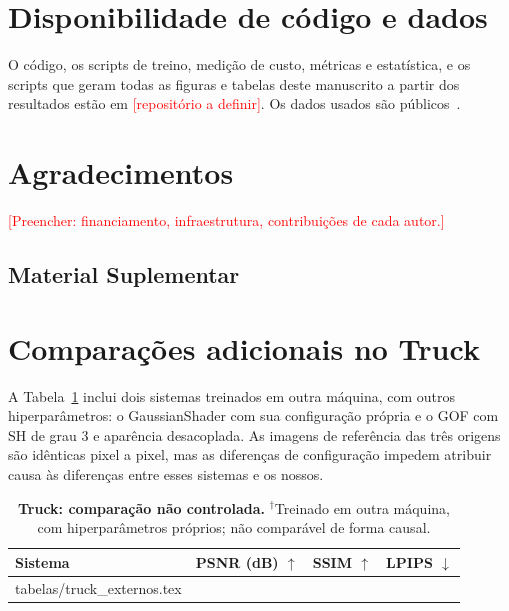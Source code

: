 \documentclass[12pt]{article}
\makeatletter
\newcommand{\revisar}[1]{\textcolor{red}{[#1]}}
\newcommand{\inputtab}[1]{\@@input #1 } %
\makeatother
\begin{document}
\section*{Disponibilidade de código e dados}
O código, os scripts de treino, medição de custo, métricas e estatística, e os scripts que geram todas as figuras e tabelas deste manuscrito a partir dos resultados estão em \revisar{repositório a definir}.
Os dados usados são públicos~\cite{knapitsch2017tanks,liu2023nero}.

\section*{Agradecimentos}
\revisar{Preencher: financiamento, infraestrutura, contribuições de cada autor.}




\newpage
\renewcommand{\thefigure}{S\arabic{figure}}
\renewcommand{\thetable}{S\arabic{table}}
\renewcommand{\theequation}{S\arabic{equation}}
\renewcommand{\thesection}{S\arabic{section}}
\setcounter{figure}{0}
\setcounter{table}{0}
\setcounter{equation}{0}
\setcounter{section}{0}

\begin{center}
\section*{Material Suplementar}
\end{center}

\section{Comparações adicionais no Truck}
A Tabela~\ref{tab:truck_externos} inclui dois sistemas treinados em outra máquina, com outros hiperparâmetros: o GaussianShader com sua configuração própria e o GOF com SH de grau 3 e aparência desacoplada.
As imagens de referência das três origens são idênticas pixel a pixel, mas as diferenças de configuração impedem atribuir causa às diferenças entre esses sistemas e os nossos.

\begin{table}[h]
\centering
\caption{\textbf{Truck: comparação não controlada.} $^\dagger$Treinado em outra máquina, com hiperparâmetros próprios; não comparável de forma causal.}
\label{tab:truck_externos}
\footnotesize
\linespread{1.0}\selectfont
\begin{tabular}{lccc}
\toprule
Sistema & PSNR (dB) $\uparrow$ & SSIM $\uparrow$ & LPIPS $\downarrow$ \\
\midrule
\inputtab{tabelas/truck_externos.tex}
\bottomrule
\end{tabular}
\end{table}
\end{document}
